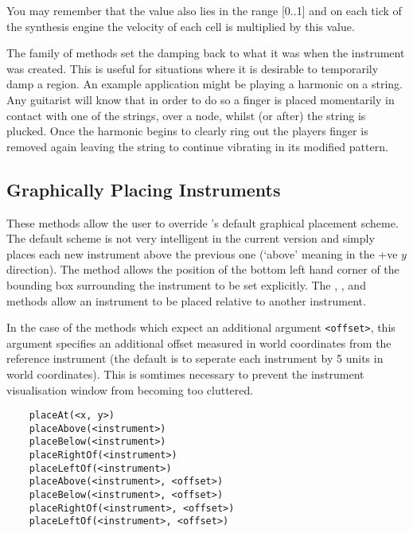You may remember that the  value also lies in the
range [0..1] and on each tick of the synthesis engine the velocity of
each cell is multiplied by this value.

The  family of methods set the damping back to what
it was when the instrument was created. This is useful for situations
where it is desirable to temporarily damp a region. An example application
might be playing a harmonic on a string. Any guitarist will know that
in order to do so a finger is placed momentarily in contact with one of
the strings, over a node, whilst (or after) the string is plucked. Once
the harmonic begins to clearly ring out the players finger is removed
again leaving the string to continue vibrating in its modified pattern.

\subsection{Graphically Placing Instruments}
\label{graphical_placement}
These methods allow the user to override \tao's default graphical placement
scheme. The default scheme is not very intelligent in the current version
and simply places each new instrument above the previous one (`above'
meaning in the +ve $y$ direction). The  method
allows the position of the bottom left hand corner of the bounding
box surrounding the instrument to be set explicitly. The 
, , 
and  methods allow an instrument to be 
placed relative to another instrument.

In the case of the methods which expect an additional argument
\verb|<offset>|, this argument specifies an additional offset
measured in world coordinates from the reference instrument (the default
is to seperate each instrument by 5 units in world coordinates).
This is somtimes necessary to prevent the instrument visualisation
window from becoming too cluttered.

\begin{verbatim}
    placeAt(<x, y>)
    placeAbove(<instrument>)
    placeBelow(<instrument>)
    placeRightOf(<instrument>)
    placeLeftOf(<instrument>)
    placeAbove(<instrument>, <offset>)
    placeBelow(<instrument>, <offset>)
    placeRightOf(<instrument>, <offset>)
    placeLeftOf(<instrument>, <offset>)
\end{verbatim}

